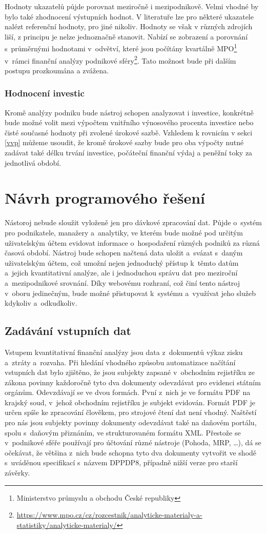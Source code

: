Hodnoty ukazatelů půjde porovnat meziročně i mezipodnikově. Velmi vhodné by bylo také zhodnocení výstupních hodnot. V literatuře lze pro některé ukazatele nalézt referenční hodnoty, pro jiné nikoliv. Hodnoty se však v různých zdrojích liší, z principu je nelze jednoznačně stanovit. Nabízí se zobrazení a porovnání s~průměrnými hodnotami v~odvětví, které jsou počítány kvartálně MPO\footnote{Ministerstvo průmyslu a obchodu České republiky} v~rámci finanční analýzy podnikové sféry\footnote{\url{https://www.mpo.cz/cz/rozcestnik/analyticke-materialy-a-statistiky/analyticke-materialy/}}. Tato možnost bude při dalším postupu prozkoumána a zvážena.


\subsubsection{Hodnocení investic}
Kromě analýzy podniku bude nástroj schopen analyzovat i investice, konkrétně bude možné volit mezi výpočtem vnitřního výnosového procenta investice nebo čisté současné hodnoty při zvolené úrokové sazbě. Vzhledem k rovnicím v sekci \ref{vvp} můžeme usoudit, že kromě úrokové sazby bude pro oba výpočty nutné zadávat také délku trvání investice, počáteční finanční výdaj a peněžní toky za jednotlivá období.


\section{Návrh programového řešení}

Nástoroj nebude sloužit vyloženě jen pro dávkové zpracování dat. Půjde o~systém pro podnikatele, manažery a~analytiky, ve kterém bude možné pod určitým uživatelským účtem evidovat informace o~hospodaření různých podniků za různá časová období. Nástroj bude schopen načtená data uložit a~svázat s~daným uživatelským účtem, což umožní nejen jednoduchý přístup k~těmto datům a~jejich kvantitativní analýze, ale i jednoduchou správu dat pro meziroční a~mezipodnikové srovnání. Díky webovému rozhraní, což činí tento nástroj v~oboru jedinečným, bude možné přistupovat k~systému a~využívat jeho služeb kdykoliv a~odkudkoliv.

\subsection{Zadávání vstupních dat}
Vstupem kvantitativní finanční analýzy jsou data z~dokumentů výkaz zisku a~ztráty a~rozvaha. Při hledání vhodného způsobu automatizace načítání vstupních dat bylo zjištěno, že jsou subjekty zapsané v~obchodním rejistříku ze zákona povinny každoročně tyto dva dokumenty odevzdávat pro evidenci státním orgánům. 
Odevzdávají se ve dvou formách. Pvní z~nich je ve formátu PDF na krajský soud, v~jehož obchodním rejistříku je subjekt evidován. Formát PDF je určen spíše ke zpracování člověkem, pro strojové čtení dat není vhodný. Naštěstí pro nás jsou subjekty povinny dokumenty odevzdávat také na daňovém portálu, spolu s~daňovým přiznáním, ve strukturovaném formátu XML. Přestože se v~podnikové sféře používají pro účtování různé nástroje (Pohoda, MRP, \dots), dá se očekávat, že většina z~nich bude schopna tyto dva dokumenty vytvořit ve shodě s~uváděnou specifikací s~názvem DPPDP8, případně nižší verze pro starší závěrky.


